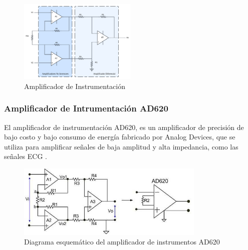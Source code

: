             \begin{figure} [H]
                \centering
                \includegraphics[width=0.5\textwidth]{img/Desarrollo/Amplificador_Intrumentacion.png}
                \caption[Amplificador de Instrumentación]{Amplificador de Instrumentación\footnotemark}
                \label{fig:Amplificador_Instrumentacion}
            \end{figure}

        \subsubsection{Amplificador de Intrumentación AD620}
            El amplificador de instrumentación AD620, es un amplificador de precisión de bajo costo y bajo consumo de energía fabricado por Analog Devices, que se utiliza para amplificar señales de baja amplitud y alta impedancia, como las señales ECG \cite{AD620_AnalogDevices,AD620_DigiKey}.

            \begin{figure}[H]
                \centering
                \includegraphics[width=0.8\textwidth]{img/Desarrollo/AD620.png}
                \caption[Diagrama esquemático del amplificador de instrumentos AD620.]{Diagrama esquemático del amplificador de instrumentos AD620\footnotemark}
                \label{fig:AD620}
            \end{figure}


